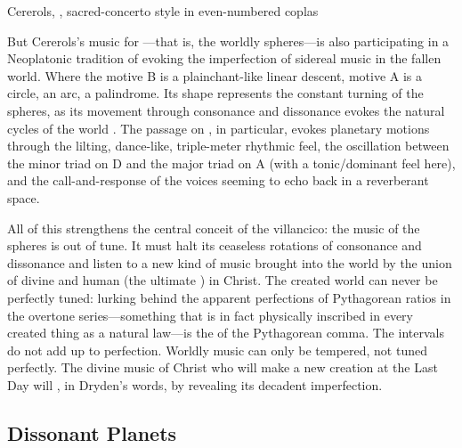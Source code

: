 {Cererols, , sacred-concerto style in even-numbered
coplas}

But Cererols's music for ---that is, the worldly
spheres---is also participating in a Neoplatonic tradition of evoking the
imperfection of sidereal music in the fallen world.
Where the  motive B is a plainchant-like linear descent, motive A
is a circle, an arc, a palindrome.
Its shape represents the constant turning of the spheres, as its movement
through consonance and dissonance evokes the natural cycles of the world
.
The passage on , in particular, evokes
planetary motions through the lilting, dance-like, triple-meter rhythmic feel,
the oscillation between the minor triad on D and the major triad on A (with a
tonic/dominant feel here), and the call-and-response of the voices seeming to
echo back in a reverberant space.

All of this strengthens the central conceit of the villancico: the music of the
spheres is out of tune.
It must halt its ceaseless rotations of consonance and dissonance and listen to
a new kind of music brought into the world by the union of divine and human (the
ultimate ) in Christ.
The created world can never be perfectly tuned: lurking behind the apparent
perfections of Pythagorean ratios in the overtone series---something that is in
fact physically inscribed in every created thing as a natural law---is the
 of the Pythagorean comma.%
The intervals do not add up to perfection.
Worldly music can only be tempered, not tuned perfectly.
The divine music of Christ who will make a new creation at the Last Day will
, in Dryden's words, by revealing its decadent
imperfection.

\subsection{Dissonant Planets}

